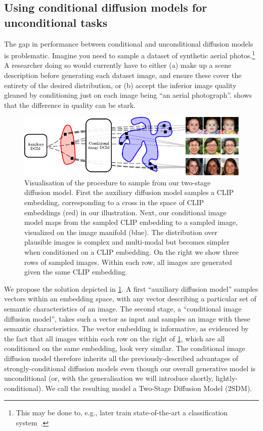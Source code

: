 \subsection{Using conditional diffusion models for unconditional tasks} \label{sec:2sdm-2sdm-method}

The gap in performance between conditional and unconditional diffusion models is problematic. Imagine you need to sample a dataset of synthetic aerial photos.\footnote{ This may be done to, e.g., later train state-of-the-art a classification system~\citep{azizi2023synthetic}.} A researcher doing so would currently have to either (a) make up a scene description before generating each dataset image, and ensure these cover the entirety of the desired distribution, or (b) accept the inferior image quality gleaned by conditioning just on each image being ``an aerial photograph''.   shows that the difference in quality can be stark.

\begin{figure}[t]
    \centering
    \includegraphics[width=\textwidth]{figs/2sdm/vcdm-diagram.pdf}
    \caption{Visualisation of the procedure to sample from our two-stage diffusion model. First the auxiliary diffusion model samples a CLIP embedding, corresponding to a cross in the space of CLIP embeddings (red) in our illustration. Next, our conditional image model maps from the sampled CLIP embedding to a sampled image, visualized on the image manifold (blue). The distribution over plausible images is complex and multi-modal but becomes simpler when conditioned on a CLIP embedding. On the right we show three rows of sampled images. Within each row, all images are generated given the same CLIP embedding.}
    \label{fig:samples}
\end{figure}
We propose the solution depicted in \cref{fig:samples}. A first ``auxiliary diffusion model'' samples vectors within an embedding space, with any vector describing a particular set of semantic characteristics of an image. The second stage, a ``conditional image diffusion model'', takes such a vector as input and samples an image with these semantic characteristics. The vector embedding is informative, as evidenced by the fact that all images within each row on the right of \cref{fig:samples}, which are all conditioned on the same embedding, look very similar. The conditional image diffusion model therefore inherits all the previously-described advantages of strongly-conditional diffusion models even though our overall generative model is unconditional (or, with the generalisation we will introduce shortly, lightly-conditional). We call the resulting model a Two-Stage Diffusion Model (2SDM).

